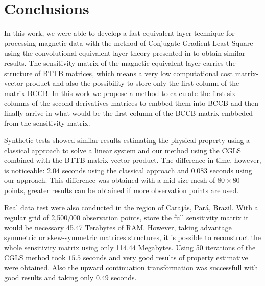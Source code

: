 \section{Conclusions}

In this work, we were able to develop a fast equivalent layer technique for processing magnetic data with the method of Conjugate Gradient Least Square using the convolutional equivalent layer theory presented in \cite{siqueira-etal2017} to obtain similar results. The sensitivity matrix of the magnetic equivalent layer carries the structure of BTTB matrices, which means a very low computational cost matrix-vector product and also the possibility to store only the first column of the matrix BCCB. In this work we propose a method to calculate the first six columns of the second derivatives matrices to embbed them into BCCB and then finally arrive in what would be the first column of the BCCB matrix embbeded from the sensitivity matrix.

Synthetic tests showed similar results estimating the physical property using a classical approach to solve a linear system and our method using the CGLS combined with the BTTB matrix-vector product. The difference in time, however, is noticeable: $2.04$ seconds using the classical approach and $0.083$ seconds using our approach. This difference was obtained with a mid-size mesh of $80 \times 80$ points, greater results can be obtained if more observation points are used.

Real data test were also conducted in the region of Carajás, Pará, Brazil. With a regular grid of 2,500,000 observation points, store the full sensitivity matrix it would be necessary 45.47 Terabytes of RAM.  However, taking advantage symmetric or skew-symmetric matrices structures, it is possible to reconstruct the whole sensitivity matrix using only 114.44 Megabytes.
Using 50 iterations of the CGLS method took $15.5$ seconds and very good results of property estimative were obtained. Also the upward continuation transformation was successfull with good results and taking only $0.49$ seconds.